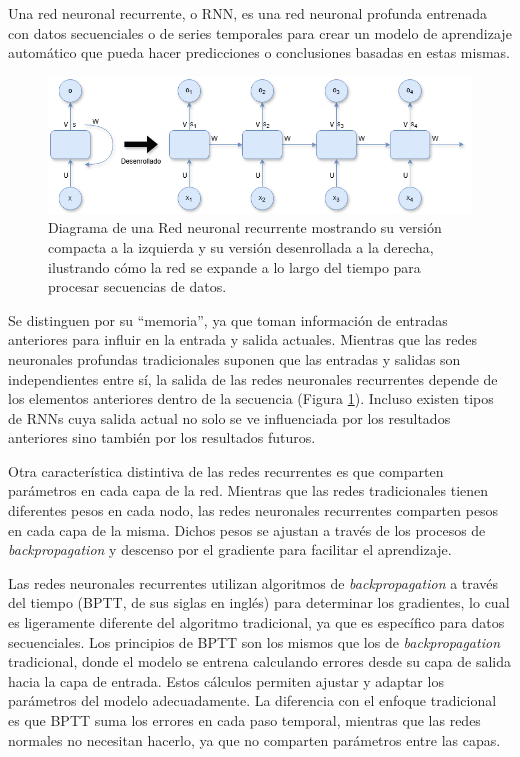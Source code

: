 Una red neuronal recurrente, o RNN, es una red neuronal profunda entrenada con datos secuenciales o de series temporales para crear un modelo de aprendizaje automático que pueda hacer predicciones o conclusiones basadas en estas mismas.

\begin{figure}[H]
    \centering
    \includegraphics[width=1\textwidth]{imagenes/RNN.drawio.png}
    \caption{Diagrama de una Red neuronal recurrente mostrando su versión compacta a la izquierda y su versión desenrollada a la derecha, ilustrando cómo la red se expande a lo largo del tiempo para procesar secuencias de datos.}
    \label{fig:rnn}
\end{figure}

Se distinguen por su “memoria”, ya que toman información de entradas anteriores para influir en la entrada y salida actuales. Mientras que las redes neuronales profundas tradicionales suponen que las entradas y salidas son independientes entre sí, la salida de las redes neuronales recurrentes depende de los elementos anteriores dentro de la secuencia (Figura \ref{fig:rnn}). Incluso existen tipos de RNNs cuya salida actual no solo se ve influenciada por los resultados anteriores sino también por los resultados futuros.

Otra característica distintiva de las redes recurrentes es que comparten parámetros en cada capa de la red. Mientras que las redes tradicionales tienen diferentes pesos en cada nodo, las redes neuronales recurrentes comparten pesos en cada capa de la misma. Dichos pesos se ajustan a través de los procesos de \textit{backpropagation} y descenso por el gradiente para facilitar el aprendizaje.

Las redes neuronales recurrentes utilizan algoritmos de \textit{backpropagation} a través del tiempo (BPTT, de sus siglas en inglés) para determinar los gradientes, lo cual es ligeramente diferente del algoritmo tradicional, ya que es específico para datos secuenciales. Los principios de BPTT son los mismos que los de \textit{backpropagation} tradicional, donde el modelo se entrena calculando errores desde su capa de salida hacia la capa de entrada. Estos cálculos permiten ajustar y adaptar los parámetros del modelo adecuadamente. La diferencia con el enfoque tradicional es que BPTT suma los errores en cada paso temporal, mientras que las redes normales no necesitan hacerlo, ya que no comparten parámetros entre las capas.

